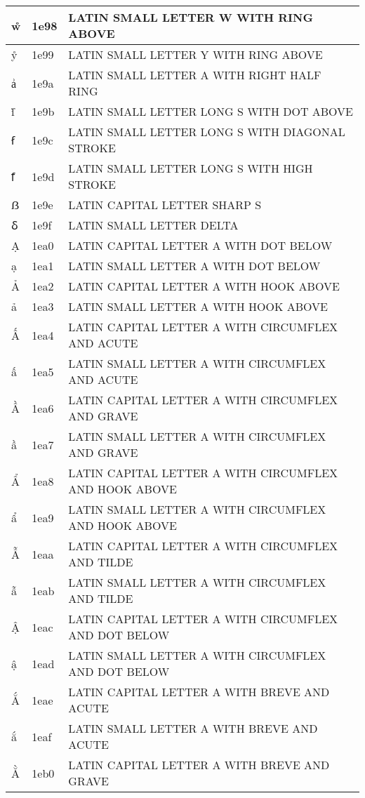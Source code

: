 \documentclass[12pt,letterpaper,openany]{book}
\begin{document}
\begin{center}
\begin{supertabular}{|m{0.25in}|m{0.5in}|m{4in}|}
			ẘ & 1e98 & LATIN SMALL LETTER W WITH RING ABOVE\\\hline
			ẙ & 1e99 & LATIN SMALL LETTER Y WITH RING ABOVE\\\hline
			ẚ & 1e9a & LATIN SMALL LETTER A WITH RIGHT HALF RING\\\hline
			ẛ & 1e9b & LATIN SMALL LETTER LONG S WITH DOT ABOVE\\\hline
			ẜ & 1e9c & LATIN SMALL LETTER LONG S WITH DIAGONAL STROKE\\\hline
			ẝ & 1e9d & LATIN SMALL LETTER LONG S WITH HIGH STROKE\\\hline
			ẞ & 1e9e & LATIN CAPITAL LETTER SHARP S\\\hline
			ẟ & 1e9f & LATIN SMALL LETTER DELTA\\\hline
			Ạ & 1ea0 & LATIN CAPITAL LETTER A WITH DOT BELOW\\\hline
			ạ & 1ea1 & LATIN SMALL LETTER A WITH DOT BELOW\\\hline
			Ả & 1ea2 & LATIN CAPITAL LETTER A WITH HOOK ABOVE\\\hline
			ả & 1ea3 & LATIN SMALL LETTER A WITH HOOK ABOVE\\\hline
			Ấ & 1ea4 & LATIN CAPITAL LETTER A WITH CIRCUMFLEX AND ACUTE\\\hline
			ấ & 1ea5 & LATIN SMALL LETTER A WITH CIRCUMFLEX AND ACUTE\\\hline
			Ầ & 1ea6 & LATIN CAPITAL LETTER A WITH CIRCUMFLEX AND GRAVE\\\hline
			ầ & 1ea7 & LATIN SMALL LETTER A WITH CIRCUMFLEX AND GRAVE\\\hline
			Ẩ & 1ea8 & LATIN CAPITAL LETTER A WITH CIRCUMFLEX AND HOOK ABOVE\\\hline
			ẩ & 1ea9 & LATIN SMALL LETTER A WITH CIRCUMFLEX AND HOOK ABOVE\\\hline
			Ẫ & 1eaa & LATIN CAPITAL LETTER A WITH CIRCUMFLEX AND TILDE\\\hline
			ẫ & 1eab & LATIN SMALL LETTER A WITH CIRCUMFLEX AND TILDE\\\hline
			Ậ & 1eac & LATIN CAPITAL LETTER A WITH CIRCUMFLEX AND DOT BELOW\\\hline
			ậ & 1ead & LATIN SMALL LETTER A WITH CIRCUMFLEX AND DOT BELOW\\\hline
			Ắ & 1eae & LATIN CAPITAL LETTER A WITH BREVE AND ACUTE\\\hline
			ắ & 1eaf & LATIN SMALL LETTER A WITH BREVE AND ACUTE\\\hline
			Ằ & 1eb0 & LATIN CAPITAL LETTER A WITH BREVE AND GRAVE\\\hline

\end{supertabular}
\end{center}
\end{document}
